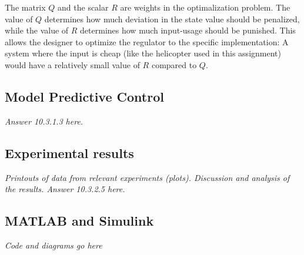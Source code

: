 \documentclass[../main.tex]{subfiles}
\begin{document}
The matrix $Q$ and the scalar $R$ are weights in the optimalization problem. The value of $Q$ determines how much deviation in the state value should be penalized, while the value of $R$ determines how much input-usage should be punished. This allows the designer to optimize the regulator to the specific implementation: A system where the input is cheap (like the helicopter used in this assignment) would have a relatively small value of $R$ compared to $Q$.

\subsection{Model Predictive Control}
\textit{Answer 10.3.1.3 here.}

\subsection{Experimental results}
\textit{Printouts of data from relevant experiments (plots).
Discussion and analysis of the results.
Answer 10.3.2.5 here.}

\subsection{MATLAB and Simulink}
\textit{Code and diagrams go here}
\end{document}
